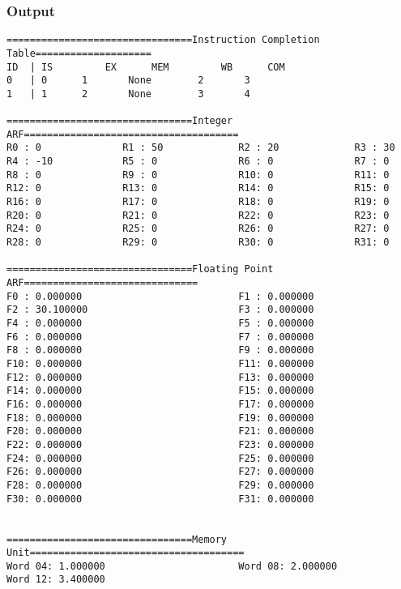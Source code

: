 \documentclass[12pt]{article}
\begin{document}
\subsubsection*{Output}
\begin{verbatim}
================================Instruction Completion Table====================
ID	| IS		 EX		 MEM		 WB		 COM
0	| 0		 1		 None		 2		 3
1	| 1		 2		 None		 3		 4

================================Integer ARF=====================================
R0 : 0              R1 : 50             R2 : 20             R3 : 30             
R4 : -10            R5 : 0              R6 : 0              R7 : 0              
R8 : 0              R9 : 0              R10: 0              R11: 0              
R12: 0              R13: 0              R14: 0              R15: 0              
R16: 0              R17: 0              R18: 0              R19: 0              
R20: 0              R21: 0              R22: 0              R23: 0              
R24: 0              R25: 0              R26: 0              R27: 0              
R28: 0              R29: 0              R30: 0              R31: 0              

================================Floating Point ARF==============================
F0 : 0.000000                           F1 : 0.000000                           
F2 : 30.100000                          F3 : 0.000000                           
F4 : 0.000000                           F5 : 0.000000                           
F6 : 0.000000                           F7 : 0.000000                           
F8 : 0.000000                           F9 : 0.000000                           
F10: 0.000000                           F11: 0.000000                           
F12: 0.000000                           F13: 0.000000                           
F14: 0.000000                           F15: 0.000000                           
F16: 0.000000                           F17: 0.000000                           
F18: 0.000000                           F19: 0.000000                           
F20: 0.000000                           F21: 0.000000                           
F22: 0.000000                           F23: 0.000000                           
F24: 0.000000                           F25: 0.000000                           
F26: 0.000000                           F27: 0.000000                           
F28: 0.000000                           F29: 0.000000                           
F30: 0.000000                           F31: 0.000000                           


================================Memory Unit=====================================
Word 04: 1.000000                       Word 08: 2.000000                       
Word 12: 3.400000
\end{verbatim}
\end{document}
